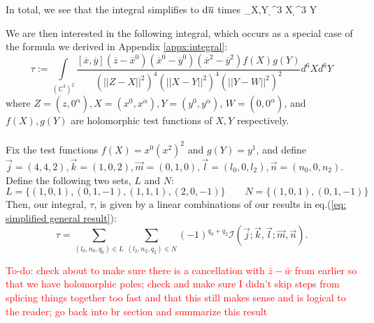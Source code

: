 \documentclass[../main.tex]{subfiles}
\begin{document}
In total, we see that the integral simplifies to $\mathrm{d} \overline u$ times 
\beqn
\int_{X,Y}  \d^3 X \d^3 Y
\eeqn

We are then interested in the following integral, which occurs as a special case of the formula we derived in Appendix \ref{appx:integral}:
\begin{equation}
    \tau := \underset{(\mathbb{C}^3)^2}{\int} \frac{ [\overline{x},\overline{y}] (\overline{z}-\overline{x}^0) (\overline{x}^0-\overline{y}^0) (\overline{x}^2-\overline{y}^2) f(X) g(Y)}{(\vert \vert Z-X \vert \vert^2)^{4} (\vert \vert X-Y \vert \vert^2)^{4} (\vert \vert Y-W \vert \vert^2)^{2}} d^6X d^6Y
\end{equation}
where $Z = (z,0^{\dot{\alpha}}), X = (x^0,x^{\dot{\alpha}}), Y = (y^0,y^{\dot{\alpha}})$, $W = (0,0^{\dot{\alpha}})$, and $f(X),g(Y)$ are holomorphic test functions of $X,Y$ respectively. \\ \\
Fix the test functions $f(X) = x^0 (x^2)^2$ and $g(Y) = y^1$, and define $\vec{j} = (4,4,2), \vec{k} = (1,0,2), \vec{m} = (0,1,0), \vec{l} = (l_0,0,l_2), \vec{n} = (n_0,0,n_2)$. Define the following two sets, $L$ and $N$:
\begin{equation}
    L = \{ (1,0,1),(0,1,-1), (1,1,1), (2,0,-1)\} \quad \quad N = \{(1,0,1),(0,1,-1)\}
\end{equation}
Then, our integral, $\tau$, is given by a linear combinations of our results in eq.(\ref{eq: simplified general result}):
\begin{equation}
    \tau = \sum_{(l_0,n_0,q_0) \in L} \sum_{(l_2,n_2,q_2) \in N} (-1)^{q_0+q_2}\mathcal{I}(\vec{j};\vec{k},\vec{l};\vec{m}, \vec{n}).   
\end{equation}

\textcolor{red}{To-do: check about to make sure there is a cancellation with $\bar{z}- \bar{w}$ from earlier so that we have holomorphic poles; check and make sure I didn't skip steps from splicing things together too fast and that this still makes sense and is logical to the reader; go back into br section and summarize this result}
\end{document}
